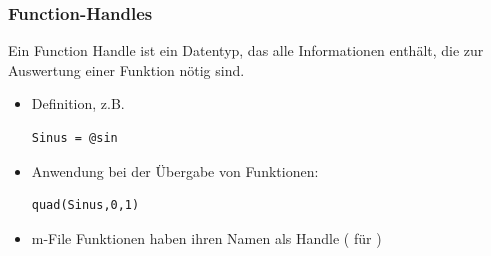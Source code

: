 \documentclass[hyperref={xetex}]{beamer}
\begin{document}
%
%
\begin{frame}[fragile]\frametitle{Function-Handles}

Ein \alert{Function Handle} ist ein Datentyp, das alle Informationen
enth\"alt, die zur Auswertung einer Funktion n\"otig sind.\\
\begin{itemize}
\item Definition, z.B. 
\begin{lstlisting}
Sinus = @sin 
\end{lstlisting}
\item Anwendung bei der \"Ubergabe von Funktionen:
\begin{lstlisting}
quad(Sinus,0,1)
\end{lstlisting}
\item m-File Funktionen haben ihren Namen als Handle (  für )
\end{itemize}
\end{frame}
\end{document}

